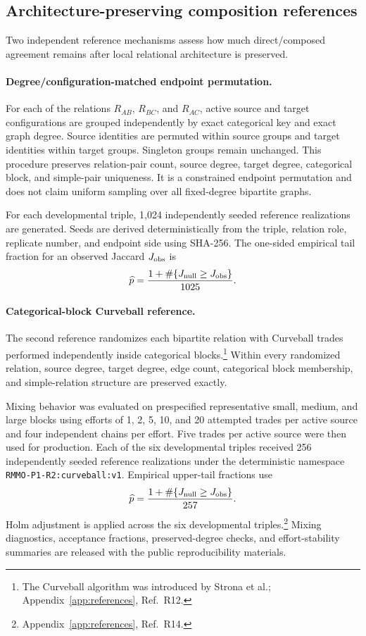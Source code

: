 \documentclass[11pt]{article}
\begin{document}
\subsection{Architecture-preserving composition references}

Two independent reference mechanisms assess how much direct/composed agreement remains after local relational architecture is preserved.

\paragraph{Degree/configuration-matched endpoint permutation.}
For each of the relations \(R_{AB}\), \(R_{BC}\), and \(R_{AC}\), active source and target configurations are grouped independently by exact categorical key and exact graph degree. Source identities are permuted within source groups and target identities within target groups. Singleton groups remain unchanged. This procedure preserves relation-pair count, source degree, target degree, categorical block, and simple-pair uniqueness. It is a constrained endpoint permutation and does not claim uniform sampling over all fixed-degree bipartite graphs.

For each developmental triple, 1,024 independently seeded reference realizations are generated. Seeds are derived deterministically from the triple, relation role, replicate number, and endpoint side using SHA-256. The one-sided empirical tail fraction for an observed Jaccard \(J_{\rm obs}\) is
\[
\widehat p
=
\frac{
1+
\#\{J_{\rm null}\ge J_{\rm obs}\}
}{
1025
}.
\]

\paragraph{Categorical-block Curveball reference.}
The second reference randomizes each bipartite relation with Curveball trades performed independently inside categorical blocks.\footnote{The Curveball algorithm was introduced by Strona et al.; Appendix~\ref{app:references}, Ref.~R12.} Within every randomized relation, source degree, target degree, edge count, categorical block membership, and simple-relation structure are preserved exactly.

Mixing behavior was evaluated on prespecified representative small, medium, and large blocks using efforts of 1, 2, 5, 10, and 20 attempted trades per active source and four independent chains per effort. Five trades per active source were then used for production. Each of the six developmental triples received 256 independently seeded reference realizations under the deterministic namespace \texttt{RMMO-P1-R2:curveball:v1}. Empirical upper-tail fractions use
\[
\widehat p
=
\frac{
1+
\#\{J_{\rm null}\ge J_{\rm obs}\}
}{
257
}.
\]
Holm adjustment is applied across the six developmental triples.\footnote{Appendix~\ref{app:references}, Ref.~R14.} Mixing diagnostics, acceptance fractions, preserved-degree checks, and effort-stability summaries are released with the public reproducibility materials.
\end{document}
